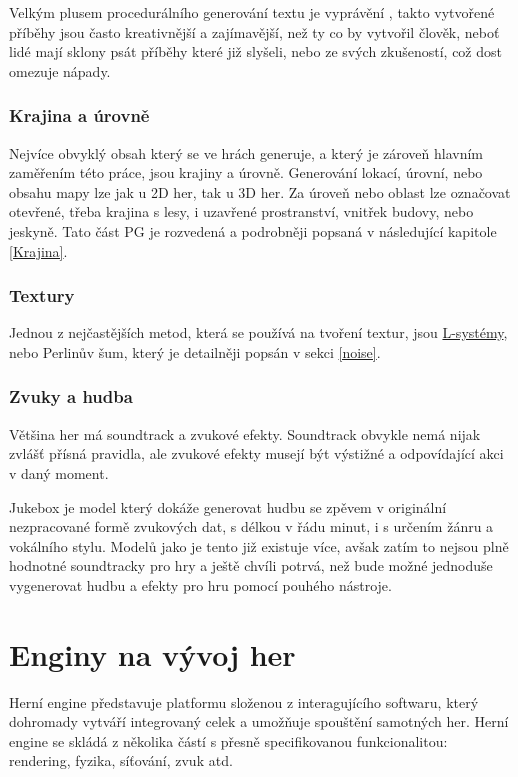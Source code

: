 Velkým plusem procedurálního generování textu je vyprávění \cite{madoc59000}, takto vytvořené příběhy jsou často kreativnější a zajímavější, než ty co by vytvořil člověk, neboť lidé mají sklony psát příběhy které již slyšeli, nebo ze svých zkušeností, což dost omezuje nápady.

\subsection{Krajina a úrovně}
Nejvíce obvyklý obsah který se ve hrách generuje, a který je zároveň hlavním zaměřením této práce, jsou krajiny a úrovně. Generování lokací, úrovní, nebo obsahu mapy lze jak u 2D her, tak u 3D her. Za úroveň nebo oblast lze označovat otevřené, třeba krajina s lesy, i uzavřené prostranství, vnitřek budovy, nebo jeskyně. Tato část PG je rozvedená a podrobněji popsaná v následující kapitole \ref{Krajina}.

\subsection{Textury}
Jednou z nejčastějších metod, která se používá na tvoření textur, jsou \hyperref[lsystems]{L-systémy}, nebo Perlinův šum, který je detailněji popsán v sekci \ref{noise}.

\subsection{Zvuky a hudba}
Většina her má soundtrack a zvukové efekty. Soundtrack obvykle nemá nijak zvlášť přísná pravidla, ale zvukové efekty musejí být výstižné a odpovídající akci v daný moment. 

Jukebox \cite{Dhariwal2020JukeboxAG} je model který dokáže generovat hudbu se zpěvem v originální nezpracované formě zvukových dat, s délkou v řádu minut, i s určením žánru a vokálního stylu. Modelů jako je tento již existuje více, avšak zatím to nejsou plně hodnotné soundtracky pro hry a ještě chvíli potrvá, než bude možné jednoduše vygenerovat hudbu a efekty pro hru pomocí pouhého nástroje.

\newpage

\chapter{Enginy na vývoj her}
\label{engines}
Herní engine představuje platformu složenou z interagujícího softwaru, který dohromady vytváří integrovaný celek a umožňuje spouštění samotných her. Herní engine se skládá z několika částí s přesně specifikovanou funkcionalitou: rendering, fyzika, síťování, zvuk atd.~\cite{nilson2007game} 

